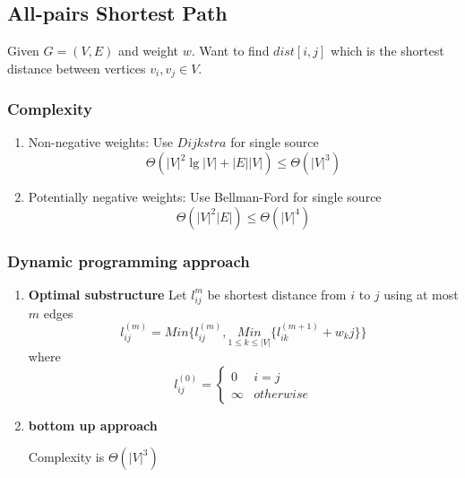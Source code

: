 \documentclass[11pt]{article}
\begin{document}
\subsection*{All-pairs Shortest Path}
Given $G = (V, E)$ and weight $w$. Want to find $dist[i, j]$ which is the shortest distance between vertices $v_i, v_j \in V$.

\begin{algorithm}[H]

\end{algorithm}

\subsubsection*{Complexity}
\begin{enumerate}
  \item Non-negative weights:  Use $Dijkstra$ for single source
  \[
    \Theta(|V|^2 \lg |V|+ |E||V|)\leq \Theta(|V|^3)
  \]
  \item Potentially negative weights: Use Bellman-Ford for single source
  \[
    \Theta(|V|^2 |E|)\leq \Theta(|V|^4)
  \]
\end{enumerate}


\subsubsection*{Dynamic programming approach}

\begin{enumerate}
  \item \textbf{Optimal substructure}
  Let $l_{ij}^m$ be shortest distance from $i$ to $j$ using at most $m$ edges
  \[
    l_{ij}^{(m)} = Min\{ l_{ij}^{(m)}, \underset{1\leq k\leq |V|}{Min}\{ l_{ik}^{(m+1)} + w_kj\} \}
  \]
  where
  \[
    l_{ij}^{(0)} =
    \begin{cases*}
      0 & i = j \\
      \infty & otherwise
    \end{cases*}
  \]
  \item \textbf{bottom up approach}


  \begin{algorithm}[H]

  \end{algorithm}

  Complexity is $\Theta(|V|^3)$
\end{enumerate}
\end{document}
